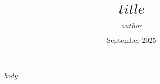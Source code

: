 \documentclass[12pt]{article}
\title{$title$}
\author{$author$}
\date{September 2025}
\begin{document}
\thispagestyle{fancy}

$body$
\end{document}
